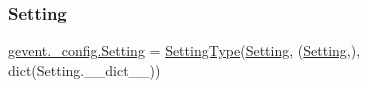 \mbox{\label{namespacegevent_1_1__config_a8e4912eac38e2ae242f267b4111390fc}} 
\subsubsection{\texorpdfstring{Setting}{Setting}}
{\footnotesize\ttfamily \hyperlink{classgevent_1_1__config_1_1_setting}{gevent.\+\_\+config.\+Setting} = \hyperlink{classgevent_1_1__config_1_1_setting_type}{Setting\+Type}(\textquotesingle{}\hyperlink{classgevent_1_1__config_1_1_setting}{Setting}\textquotesingle{}, (\hyperlink{classgevent_1_1__config_1_1_setting}{Setting},), dict(Setting.\+\_\+\+\_\+dict\+\_\+\+\_\+))}

